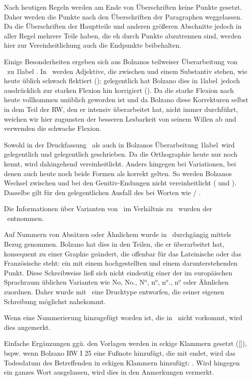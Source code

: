 \begin{aufza}
\item Nach heutigen Regeln werden am Ende von Überschriften keine Punkte gesetzt. Daher werden die Punkte nach den Überschriften der Paragraphen weggelassen. Da die Überschriften der Hauptteile und anderen größeren Abschnitte jedoch in aller Regel mehrere Teile haben, die eh durch Punkte abzutrennen sind, werden hier zur Vereinheitlichung auch die Endpunkte beibehalten.
\item Einige Besonderheiten ergeben sich aus Bolzanos teilweiser Überarbeitung von \Alabel\ zu \A1label . In \Alabel\ werden Adjektive, die zwischen  und einem Substantiv stehen, wie heute üblich schwach flektiert (); gelegentlich hat Bolzano dies in \A1label\ jedoch ausdrücklich zur starken Flexion hin korrigiert (). Da die starke Flexion nach  heute vollkommen unüblich geworden ist und da Bolzano diese Korrekturen selbst in dem Teil der RW, den er intensiv überarbeitet hat, nicht immer durchführt, weichen wir hier zugunsten der besseren Lesbarkeit von seinem Willen ab und verwenden die schwache Flexion.
\item Sowohl in der Druckfassung \Alabel\  als auch in Bolzanos Überarbeitung \A1label\ wird gelegentlich  und gelegentlich  geschrieben. Da die Orthographie heute nur noch  kennt, wird dahingehend vereinheitlicht. Anders hingegen bei Variationen, bei denen auch heute noch beide Formen als korrekt gelten. So werden Bolzanos Wechsel zwischen  und  bei den Genitiv-Endungen nicht vereinheitlicht ( und ). Dasselbe gilt für den gelegentlichen Ausfall des  bei Worten wie  / . 
\item Die Informationen über Varianten von \Blabel\ im Verhältnis zu \Alabel\ wurden der \GAlabel\ entnommen. 
\item Auf Nummern von Absätzen oder Ähnlichem wurde in \Alabel\ durchgängig mittels  Bezug genommen. Bolzano hat dies in den Teilen, die er überarbeitet hat, konsequent zu einer Graphie geändert, die offenbar für das Lateinische  oder das Französische  steht: ein  mit einem hochgestellten  und einem darunterstehenden Punkt. Diese Schreibweise ließ sich nicht eindeutig einer der im europäischen Sprachraum üblichen Varianten wie No, No., N$^{\mathrm{o}}$, n$^{\mathrm{o}}$, n$^{\mathrm{o}}\!.$, n$^{\underline{\mathrm{o}}}$ oder Ähnlichen zuordnen. Daher wurde mit \no\ eine Drucktype entworfen, die seiner eigenen Schreibung möglichst nahekommt.
\item Wenn eine Nummerierung hinzugefügt worden ist, die in \Alabel\ nicht vorkommt, wird dies angemerkt.
\item Einfache Ergänzungen ggü. den Vorlagen werden in eckige Klammern gesetzt ([\auslass ]), bspw. wenn Bolzano RW I 25 eine Fußnote hinzufügt, die mit  endet, wird das Todesdatum des Betreffenden in eckigen Klammern hinzufügt: . Wird hingegen ein ganzes Wort ausgelassen, wird dies in den Anmerkungen vermerkt.
\end{aufza}

\endinput